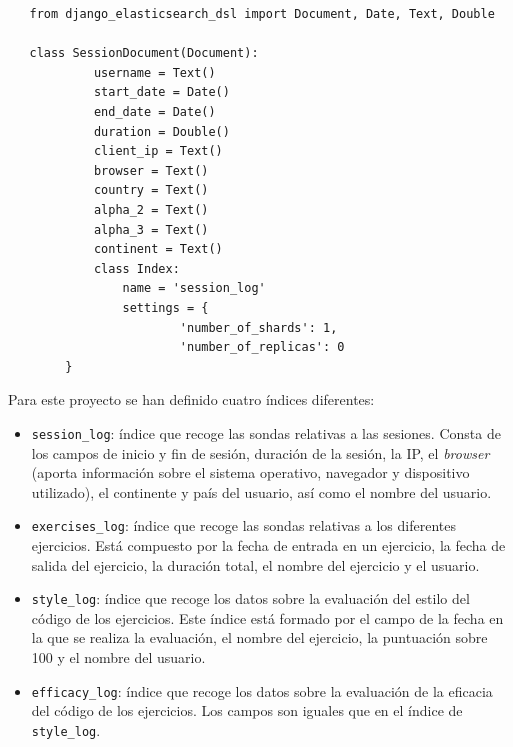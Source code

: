 \begin{lstlisting}
   from django_elasticsearch_dsl import Document, Date, Text, Double
   
   class SessionDocument(Document):
    		username = Text()
  	  		start_date = Date()
   			end_date = Date()
    		duration = Double()
    		client_ip = Text()
    		browser = Text()
    		country = Text()
    		alpha_2 = Text()
    		alpha_3 = Text()
    		continent = Text()
    		class Index:
        		name = 'session_log'
        		settings = {
            			'number_of_shards': 1,
           				'number_of_replicas': 0
        }
\end{lstlisting} 

Para este proyecto se han definido cuatro índices diferentes:

\begin{itemize}
\item \texttt{session\_log}: índice que recoge las sondas relativas a las sesiones. Consta de los campos de inicio y fin de sesión, duración de la sesión, la IP, el \textit{browser} (aporta información sobre el sistema operativo, navegador y dispositivo utilizado), el continente y país del usuario, así como el nombre del usuario.
\item \texttt{exercises\_log}: índice que recoge las sondas relativas a los diferentes ejercicios. Está compuesto por la fecha de entrada en un ejercicio, la fecha de salida del ejercicio, la duración total, el nombre del ejercicio y el usuario.
\item \texttt{style\_log}: índice que recoge los datos sobre la evaluación del estilo del código de los ejercicios. Este índice está formado por el campo de la fecha en la que se realiza la evaluación, el nombre del ejercicio, la puntuación sobre 100 y el nombre del usuario.
\item \texttt{efficacy\_log}: índice que recoge los datos sobre la evaluación de la eficacia del código de los ejercicios. Los campos son iguales que en el índice de \texttt{style\_log}.
\end{itemize}


